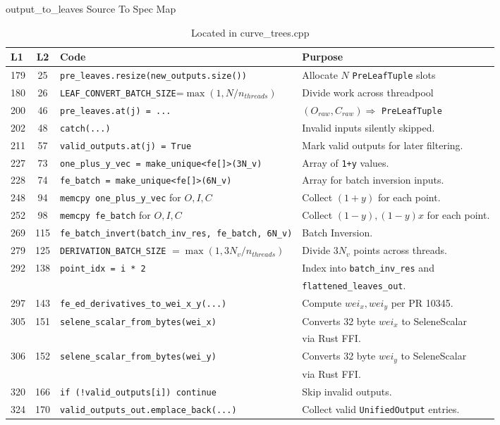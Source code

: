\documentclass[12pt,titlepage,table]{article}
\begin{document}
\begin{table}[htbp]
\caption{output\_to\_leaves Source To Spec Map}
\begin{adjustwidth}{-1in}{-1in}
\centering
{
\begin{tabular}{| l | c | l | l |}
\hline
\textbf{L1} & \textbf{L2} & \textbf{Code} & \textbf{Purpose} \\
\hline
\hline
179 & 25 & \verb+pre_leaves.resize(new_outputs.size())+ & Allocate $N$ \verb|PreLeafTuple| slots \\
180 & 26 & \verb|LEAF_CONVERT_BATCH_SIZE|=$\max\left(1,N/n_{threads} \right)$ & Divide work across threadpool \\
200 & 46 & \verb|pre_leaves.at(j) = ...| & $(O_{raw},C_{raw}) \Rightarrow$ \verb|PreLeafTuple|\\
202 & 48 & \verb|catch(...)| & Invalid inputs silently skipped.\\
211 & 57 & \verb|valid_outputs.at(j) = True|& Mark valid outputs for later filtering. \\
227 & 73 & \verb|one_plus_y_vec = make_unique<fe[]>(3N_v)| & Array of \verb|1+y| values. \\
228 & 74 & \verb|fe_batch = make_unique<fe[]>(6N_v)|& Array for batch inversion inputs. \\
248 & 94 & \verb|memcpy one_plus_y_vec| for $O,I,C$ & Collect $(1+y)$ for each point. \\
252 & 98 & \verb|memcpy fe_batch| for $O,I,C$ & Collect $(1-y), (1-y)x$ for each point. \\
269 & 115 &\verb|fe_batch_invert(batch_inv_res, fe_batch, 6N_v)| & Batch Inversion. \\
279 & 125 &\verb|DERIVATION_BATCH_SIZE| $= \max(1, 3N_v / n_{threads})$ & Divide $3N_v$ points across threads.\\
292 & 138 & \verb|point_idx = i * 2| & Index into \verb|batch_inv_res| and \\
&&&\verb|flattened_leaves_out|. \\
297 & 143 &\verb|fe_ed_derivatives_to_wei_x_y(...)| & Compute $wei_x,wei_y$ per PR 10345. \\
305 & 151 & \verb|selene_scalar_from_bytes(wei_x)| & Converts 32 byte $wei_x$ to SeleneScalar \\
&&& via Rust FFI.\\
306 & 152 & \verb|selene_scalar_from_bytes(wei_y)| & Converts 32 byte $wei_y$ to SeleneScalar \\
&&& via Rust FFI.\\
320 & 166 & \verb|if (!valid_outputs[i]) continue| & Skip invalid outputs. \\
324 & 170 & \verb|valid_outputs_out.emplace_back(...)| & Collect valid \verb|UnifiedOutput| entries.\\
\hline
\end{tabular}}
\end{adjustwidth}
\caption*{Located in curve\_trees.cpp}
\end{table}
\end{document}
